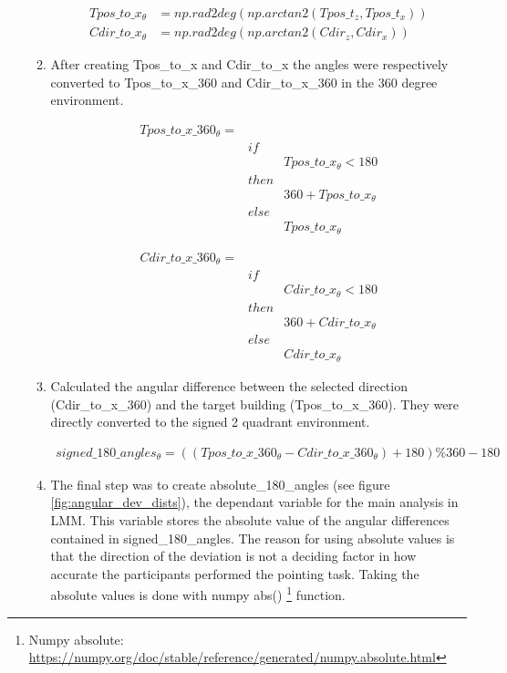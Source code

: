 \begin{enumerate}
\begin{enumerate}
		\begin{align*}
			Tpos\_to\_x_{\theta} & = np.rad2deg(np.arctan2(Tpos\_t_{z}, Tpos\_t_{x})) \\
			Cdir\_to\_x_{\theta} & = np.rad2deg(np.arctan2(Cdir_{z}, Cdir_{x}))
		\end{align*}
		
		\item After creating {\emphasize Tpos\_to\_x} and {\emphasize Cdir\_to\_x} the angles were respectively converted to {\emphasize Tpos\_to\_x\_360} and {\emphasize Cdir\_to\_x\_360} in the 360 degree environment.

		\begin{align*}
			Tpos\_to\_x\_360_{\theta} = & \\
			& if & \\
			&& Tpos\_to\_x_{\theta} < 180 \\
			& then & \\
			&& 360 + Tpos\_to\_x_{\theta} \\
			& else & \\
			&& Tpos\_to\_x_{\theta}
		\end{align*}
	
		\begin{align*}
			Cdir\_to\_x\_360_{\theta} = & \\
			& if & \\
			&& Cdir\_to\_x_{\theta} < 180 \\
			& then & \\
			&& 360 + Cdir\_to\_x_{\theta} \\
			& else & \\
			&& Cdir\_to\_x_{\theta}
		\end{align*}
		
		\item Calculated the angular difference between the selected direction {\emphasize (Cdir\_to\_x\_360)} and the target building {\emphasize (Tpos\_to\_x\_360)}. They were directly converted to the signed 2 quadrant environment.
		
		\begin{align*}
			signed\_180\_angles_{\theta} = ((Tpos\_to\_x\_360_{\theta} - Cdir\_to\_x\_360_{\theta}) + 180) \% 360 - 180
		\end{align*}
	
		\item The final step was to create {\emphasize absolute\_180\_angles} (see figure \ref{fig:angular_dev_dists}), the dependant variable for the main analysis in LMM. This variable stores the absolute value of the angular differences contained in {\emphasize signed\_180\_angles}. The reason for using absolute values is that the direction of the deviation is not a deciding factor in how accurate the participants performed the pointing task. Taking the absolute values is done with numpy abs() \footnote{Numpy absolute: \href{https://numpy.org/doc/stable/reference/generated/numpy.absolute.html}{https://numpy.org/doc/stable/reference/generated/numpy.absolute.html}} function.
		

\end{enumerate}
\end{enumerate}
